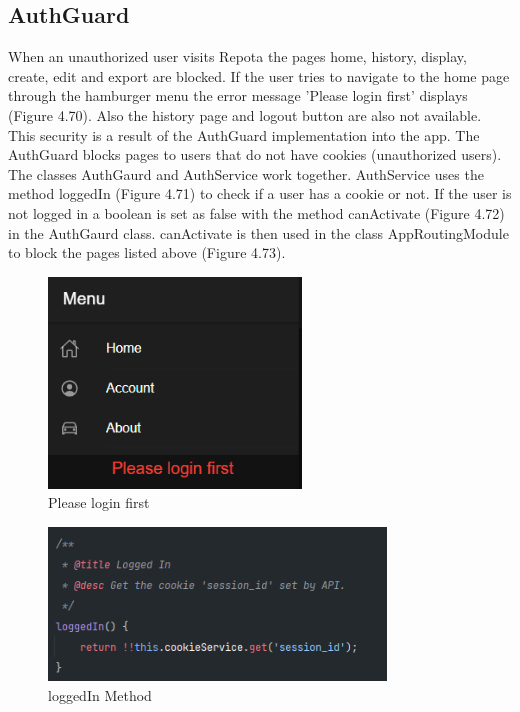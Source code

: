 \subsection{AuthGuard}
When an unauthorized user visits Repota the pages home, history, display, create, edit and export are blocked. If the user tries to navigate to the home page through the hamburger menu the error message 'Please login first' displays (Figure 4.70). Also the history page and logout button are also not available. This security is a result of the AuthGuard implementation into the app. The AuthGuard blocks pages to users that do not have cookies (unauthorized users). The classes AuthGaurd and AuthService work together. AuthService uses the method loggedIn (Figure 4.71) to check if a user has a cookie or not. If the user is not logged in a boolean is set as false with the method canActivate (Figure 4.72) in the AuthGaurd class. canActivate is then used in the class AppRoutingModule to block the pages listed above (Figure 4.73).

\begin{figure}[H]
    \centering
    \caption{Please login first}
    \label{image:pleaseLogin}
    \includegraphics[width=0.6\textwidth]{images/repota/UI/please_login.png}
\end{figure}

\begin{figure}[H]
    \centering
    \caption{loggedIn Method}
    \label{image:loggedIn}
    \includegraphics[width=0.8\textwidth]{images/repota/auth_guard/loggedIn.png}
\end{figure}

